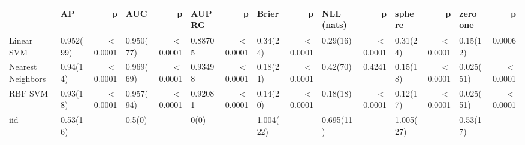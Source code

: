 \documentclass[a0,landscape]{a0poster}
\begin{document}
\begin{multicols}{2}
\begin{center}
{\begin{tabular}{|l|l|r|l|r|l|r|l|r|l|r|l|r|l|r|}
\toprule
{}                &       {AP} &      {p} &      {AUC} &      {p} &  {AUPRG} &      {p} &    {Brier} &      {p} & {NLL (nats)} &      {p} &   {sphere} &      {p} & {zero one} &      {p} \\
\midrule
Linear SVM        &  0.952(99) &  $<$0.0001 &  0.950(77) &  $<$0.0001 &  0.88705 &  $<$0.0001 &  0.34(24)  &  $<$0.0001 &    0.29(16)  &  $<$0.0001 &  0.31(24)  &  $<$0.0001 &  0.15(12)  &   0.0006 \\
Nearest Neighbors &  0.94(14)  &  $<$0.0001 &  0.969(69) &  $<$0.0001 &  0.93498 &  $<$0.0001 &  0.18(21)  &  $<$0.0001 &    0.42(70)  &   0.4241 &  0.15(18)  &  $<$0.0001 &  0.025(51) &  $<$0.0001 \\
RBF SVM           &  0.93(18)  &  $<$0.0001 &  0.957(94) &  $<$0.0001 &  0.92081 &  $<$0.0001 &  0.14(20)  &  $<$0.0001 &    0.18(18)  &  $<$0.0001 &  0.12(17)  &  $<$0.0001 &  0.025(51) &  $<$0.0001 \\
iid               &  0.53(16)  &     {--} &  0.5(0)    &     {--} &  0(0)    &     {--} &  1.004(22) &     {--} &    0.695(11) &     {--} &  1.005(27) &     {--} &  0.53(17)  &     {--} \\
\bottomrule
\end{tabular}
}
\end{center}


\end{multicols}
\end{document}
